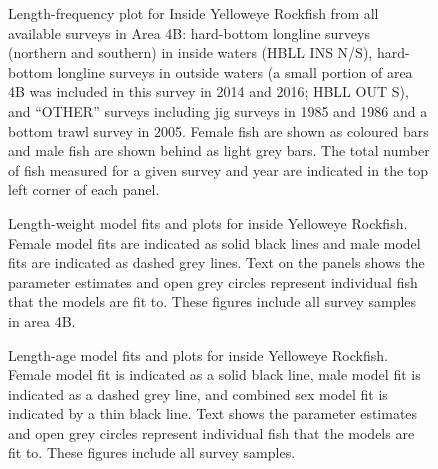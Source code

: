\documentclass[11pt]{book}
\begin{document}
\begin{figure}[htb]

{\centering {} 

}

\caption{Length-frequency plot for Inside Yelloweye Rockfish from all available surveys in Area 4B: hard-bottom longline surveys (northern and southern) in inside waters (HBLL INS N/S), hard-bottom longline surveys in outside waters (a small portion of area 4B was included in this survey in 2014 and 2016; HBLL OUT S), and ``OTHER'' surveys including jig surveys in 1985 and 1986 and a bottom trawl survey in 2005. Female fish are shown as coloured bars and male fish are shown behind as light grey bars. The total number of fish measured for a given survey and year are indicated in the top left corner of each panel.}\label{fig:length-freq}
\end{figure}
\begin{figure}[htb]

{\centering {} 

}

\caption{Length-weight model fits and plots for inside Yelloweye Rockfish. Female model fits are indicated as solid black lines and male model fits are indicated as dashed grey lines. Text on the panels shows the parameter estimates and open grey circles represent individual fish that the models are fit to. These figures include all survey samples in area 4B.}\label{fig:length-weight}
\end{figure}
\begin{figure}[htb]

{\centering {} 

}

\caption{Length-age model fits and plots for inside Yelloweye Rockfish. Female model fit is indicated as a solid black line, male model fit is indicated as a dashed grey line, and combined sex model fit is indicated by a thin black line. Text shows the parameter estimates and open grey circles represent individual fish that the models are fit to. These figures include all survey samples.}\label{fig:length-age}
\end{figure}
\end{document}
